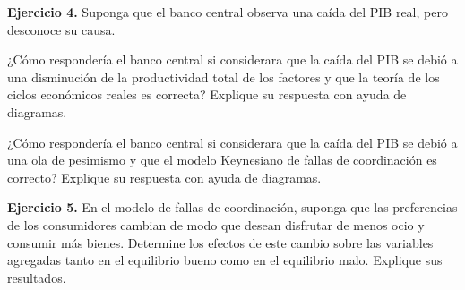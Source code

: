 \documentclass[11pt]{article}
\let\enumerateoriginal\enumerate
\let\endenumerateoriginal\endenumerate
\renewenvironment{enumerate}{%
  \enumerateoriginal
  \setlength{\itemsep}{0.5em}%
  \setlength{\parsep}{0pt}%
  \setlength{\topsep}{0.4em}%
}{\endenumerateoriginal}
\begin{document}
\textbf{Ejercicio 4.} Suponga que el banco central observa una caída del PIB real, pero desconoce su causa.
\begin{enumerate}
    \item ¿Cómo respondería el banco central si considerara que la caída del PIB se debió a una disminución de la productividad total de los factores y que la teoría de los ciclos económicos reales es correcta? Explique su respuesta con ayuda de diagramas.

    \item ¿Cómo respondería el banco central si considerara que la caída del PIB se debió a una ola de pesimismo y que el modelo Keynesiano de fallas de coordinación es correcto? Explique su respuesta con ayuda de diagramas.
\end{enumerate}


\textbf{Ejercicio 5.} En el modelo de fallas de coordinación, suponga que las preferencias de los consumidores cambian de modo que desean disfrutar de menos ocio y consumir más bienes. Determine los efectos de este cambio sobre las variables agregadas tanto en el equilibrio bueno como en el equilibrio malo. Explique sus resultados.
\end{document}
